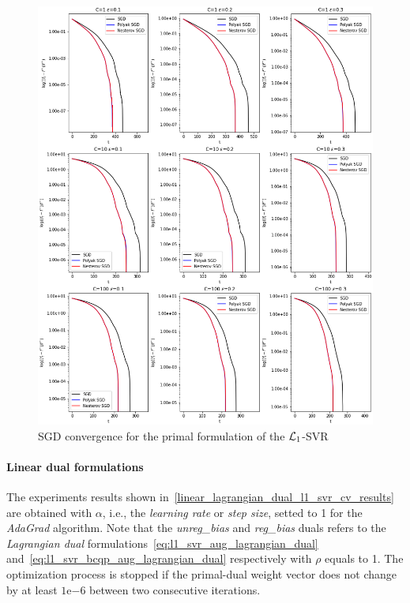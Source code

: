 \begin{figure}[H]
	\centering
	\includegraphics[scale=0.5]{img/l1_svr_loss_history}
	\caption{SGD convergence for the primal formulation of the $\protect \mathcal{L}_1$-SVR}
	\label{fig:l1_svr_loss_history}
\end{figure}

\pagebreak

\paragraph{Linear dual formulations}

The experiments results shown in~\ref{linear_lagrangian_dual_l1_svr_cv_results} are obtained with $\alpha$, i.e., the \emph{learning rate} or \emph{step size}, setted to 1 for the \emph{AdaGrad} algorithm. Note that the \emph{unreg\_bias} and \emph{reg\_bias} duals refers to the \emph{Lagrangian dual} formulations~\eqref{eq:l1_svr_aug_lagrangian_dual} and~\eqref{eq:l1_svr_bcqp_aug_lagrangian_dual} respectively with $\rho$ equals to 1. The optimization process is stopped if the primal-dual weight vector does not change by at least $1\mathrm{e}{-6}$  between two consecutive iterations.

